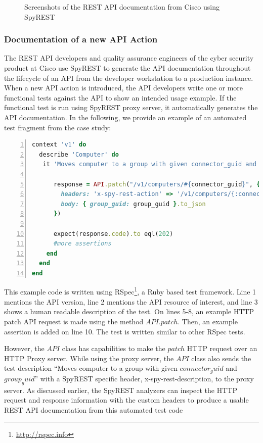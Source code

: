 \documentclass[10pt, conference]{IEEEtran}
\begin{document}
\begin{figure}
{\label{fig:screenshot_response}
}
\caption{Screenshots of the REST API documentation from Cisco using SpyREST}
\label{fig:screenshot}
\end{figure}

\subsubsection{Documentation of a new API Action}
The REST API developers and quality assurance engineers of the cyber security product at Cisco use SpyREST to generate the API documentation throughout the lifecycle of an API from the developer workstation to a production instance. When a new API action is introduced, the API developers write one or more functional tests against the API to show an intended usage example. If the functional test is run using SpyREST proxy server, it automatically generates the API documentation. In the following, we provide an example of an automated test fragment from the case study:

\begin{lstlisting}[language=Ruby,breaklines=true,showspaces=false,showstringspaces=false,numbers=left,xleftmargin=2em]
context 'v1' do
  describe 'Computer' do
   it 'Moves computer to a group with given connector_guid and group_guid' do

      response = API.patch("/v1/computers/#{connector_guid}", {
        headers: 'x-spy-rest-action' => '/v1/computers/{:connector_guid}',
        body: { group_guid: group_guid }.to_json
      })

      expect(response.code).to eql(202)
      #more assertions
    end
  end
end
\end{lstlisting}


This example code is written using RSpec\footnote{\url{http://rspec.info}}, a Ruby based test framework. Line 1 mentions the API version, line 2 mentions the API resource of interest, and line 3 shows a human readable description of the test. On lines 5-8, an example HTTP patch API request is made using the method $API.patch$. Then, an example assertion is added on line 10. The test is written similar to other RSpec tests.

However, the $API$ class has capabilities to make the $patch$ HTTP request over an HTTP Proxy server. While using the proxy server, the $API$ class also sends the test description ``Moves computer to a group with given $connector_guid$ and $group_guid$'' with a SpyREST specific header, x-spy-rest-description, to the proxy server. As discussed earlier, the SpyREST analyzers can inspect the HTTP request and response information with the custom headers to produce a usable REST API documentation from this automated test code
\end{document}
